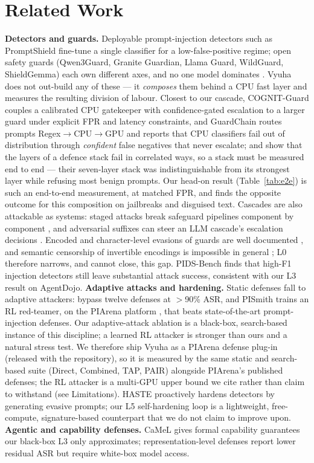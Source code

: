 \documentclass[11pt]{article}
\begin{document}
\section{Related Work}
\textbf{Detectors and guards.} Deployable prompt-injection detectors such as PromptShield
\citep{promptshield} fine-tune a single classifier for a low-false-positive regime; open safety guards
(Qwen3Guard, Granite Guardian, Llama Guard, WildGuard, ShieldGemma) each own different axes, and no one
model dominates \citep{guard-bench}. Vyuha does not out-build any of these --- it \emph{composes} them
behind a CPU fast layer and measures the resulting division of labour. Closest to our cascade,
COGNIT-Guard \citep{cognit} couples a calibrated CPU gatekeeper with confidence-gated escalation to a
larger guard under explicit FPR and latency constraints, and
GuardChain \citep{guardchain} routes prompts Regex$\rightarrow$CPU$\rightarrow$GPU and reports that CPU
classifiers fail out of distribution through \emph{confident} false negatives that never escalate; and
\citet{layered-ensemble} show that the layers of a defence stack fail in correlated ways, so a stack must
be measured end to end --- their seven-layer stack was indistinguishable from its strongest layer while
refusing most benign prompts. Our head-on result (Table~\ref{tab:e2e}) is such an end-to-end measurement,
at matched FPR, and finds the opposite outcome for this composition on jailbreaks and disguised text.
Cascades are also attackable as systems: staged attacks break safeguard pipelines component by component
\citep{stack}, and adversarial suffixes can steer an LLM cascade's escalation decisions \citep{cascade-attack}.
Encoded and character-level evasions of guards are well documented \citep{hackett,emoji}, and semantic
censorship of invertible encodings is impossible in general \citep{glukhov}; L0 therefore narrows, and
cannot close, this gap. PIDS-Bench \citep{pidsbench} finds that high-F1 injection detectors still leave
substantial attack success, consistent with our L3 result on AgentDojo.
\textbf{Adaptive attacks and hardening.} Static defenses fall to adaptive attackers:
\citet{attacker-second} bypass twelve defenses at $>$90\% ASR, and PISmith \citep{pismith} trains an
RL red-teamer, on the PIArena platform \citep{piarena}, that beats state-of-the-art prompt-injection
defenses. Our adaptive-attack ablation is a black-box, search-based instance of this discipline; a
learned RL attacker is stronger than ours and a natural stress test. We therefore ship Vyuha as a
PIArena defense plug-in (released with the repository), so it is measured by the same static and search-based suite
(Direct, Combined, TAP, PAIR) alongside PIArena's published defenses; the RL attacker is a multi-GPU
upper bound we cite rather than claim to withstand (see Limitations). HASTE \citep{haste} proactively hardens detectors by generating
evasive prompts; our L5 self-hardening loop is a lightweight, free-compute, signature-based counterpart
that we do not claim to improve upon.
\textbf{Agentic and capability defenses.} CaMeL \citep{camel} gives formal capability guarantees our
black-box L3 only approximates; representation-level defenses report lower residual ASR but require
white-box model access.
\end{document}
